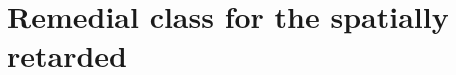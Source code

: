 \documentclass{article}
\begin{document}
	
\section{Remedial class for the spatially retarded}
	
	
\end{document}
